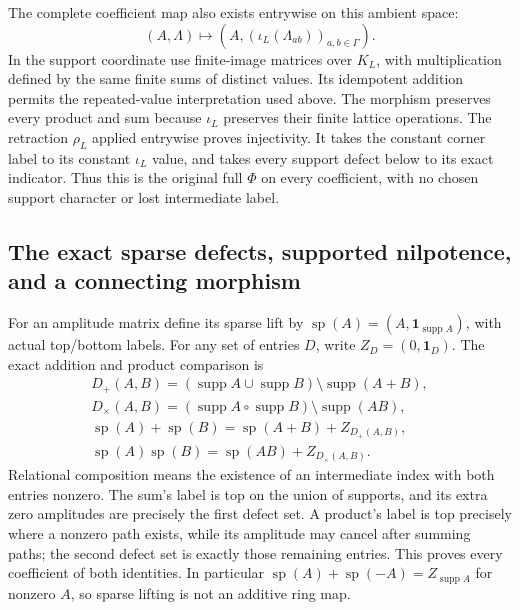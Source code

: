 The complete coefficient map also exists
entrywise on this ambient space:
\begin{equation}\tag{CFP42}
 (A,\Lambda)\longmapsto
      (A,(\iota_L(\Lambda_{ab}))_{a,b\in\Gamma}).
\end{equation}
In the support coordinate use finite-image
matrices over $K_L$, with multiplication
defined by the same finite sums of distinct
values. Its idempotent addition permits
the repeated-value interpretation used
above. The morphism preserves every product
and sum because $\iota_L$ preserves their
finite lattice operations. The retraction
$\rho_L$ applied entrywise proves injectivity.
It takes the constant corner label to its
constant $\iota_L$ value, and takes every
support defect below to its exact indicator.
Thus this is the original full $\Phi$ on
every coefficient, with no chosen support
character or lost intermediate label.

\subsection{The exact sparse defects, supported nilpotence, and a connecting morphism}

For an amplitude matrix define its sparse
lift by $\operatorname{sp}(A)=(A,\mathbf1_{\operatorname{supp}A})$,
with actual top/bottom labels. For any
set of entries $D$, write
$Z_D=(0,\mathbf1_D)$. The exact addition
and product comparison is
\begin{equation}\tag{CFP43}
\begin{gathered}
 D_+(A,B)=(\operatorname{supp}A\cup\operatorname{supp}B)
                               \setminus\operatorname{supp}(A+B),\\
 D_\times(A,B)=(\operatorname{supp}A\circ\operatorname{supp}B)
                               \setminus\operatorname{supp}(AB),\\
 \operatorname{sp}(A)+\operatorname{sp}(B)
             =\operatorname{sp}(A+B)+Z_{D_+(A,B)},\\
 \operatorname{sp}(A)\operatorname{sp}(B)
             =\operatorname{sp}(AB)+Z_{D_\times(A,B)}.
\end{gathered}
\end{equation}
Relational composition means the existence
of an intermediate index with both entries
nonzero. The sum's label is top on the
union of supports, and its extra zero
amplitudes are precisely the first defect
set. A product's label is top precisely
where a nonzero path exists, while its
amplitude may cancel after summing paths;
the second defect set is exactly those
remaining entries. This proves every
coefficient of both identities.
In particular $\operatorname{sp}(A)+
\operatorname{sp}(-A)=Z_{\operatorname{supp}A}$
for nonzero $A$, so sparse lifting is
not an additive ring map.

